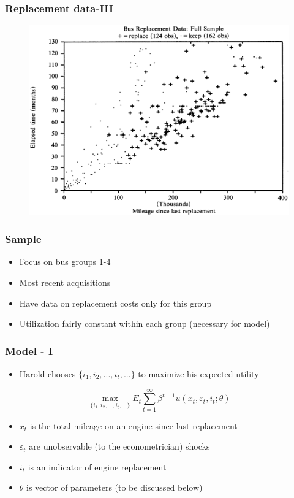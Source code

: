 \documentclass{beamer}
\begin{document}
\begin{frame}
\frametitle{Replacement data-III}
\begin{center}
\begin{figure}[h!]
\includegraphics[scale =0.5]{replacement_data.png}
\end{figure}
\end{center}
\end{frame}

\begin{frame}
\frametitle{Sample }
\begin{itemize}
\item Focus on bus groups 1-4
\bigskip
\item Most recent acquisitions
\bigskip
\item Have data on replacement costs only for this group
\bigskip
\item Utilization fairly constant within each group (necessary for model)
\end{itemize}
\end{frame}

\begin{frame}
\frametitle{Model - I}
\begin{itemize}
\item Harold chooses $\{i_1,i_2,{...},i_t,{...}\}$ to maximize his expected utility
\end{itemize}
\[ \max_{\{i_1,i_2,{...},i_t,{...}\}}E_t\sum_{t=1}^\infty \beta^{t-1} u(x_t,\varepsilon_t,i_t;\theta)\]
\begin{itemize}
\item  $x_t$ is the total mileage on an engine since last replacement
\bigskip
\item $\varepsilon_t$ are unobservable (to the econometrician) shocks
\bigskip
\item $i_t$ is an indicator of engine replacement
\bigskip
\item $\theta$ is vector of parameters (to be discussed below)
\end{itemize}

\end{frame}
\end{document}
